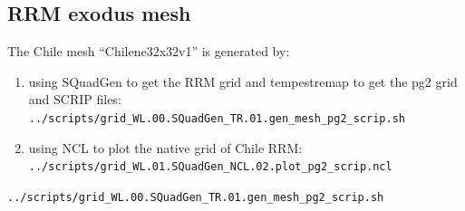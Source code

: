 \documentclass[journal abbreviation, manuscript]{copernicus}
\begin{document}
\newpage
\subsection{RRM exodus mesh}
The Chile mesh ``Chilene32x32v1'' is generated by:
\begin{enumerate}
  \item using SQuadGen to get the RRM grid and tempestremap to get the pg2 grid and SCRIP files: \lstinline|../scripts/grid_WL.00.SQuadGen_TR.01.gen_mesh_pg2_scrip.sh|
  \item using NCL to plot the native grid of Chile RRM: \lstinline|../scripts/grid_WL.01.SQuadGen_NCL.02.plot_pg2_scrip.ncl|
\end{enumerate}
\vspace{\baselineskip}


\lstinline|../scripts/grid_WL.00.SQuadGen_TR.01.gen_mesh_pg2_scrip.sh|
\end{document}
